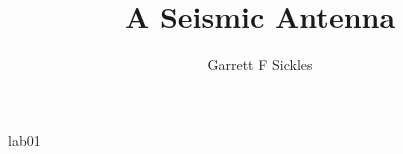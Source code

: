 
\def\thisdoc{lab01}
\def\exedirs{sigsbee}

\author{Garrett F Sickles}
\title{A Seismic Antenna}{\thisdoc}

%



%

\tiny
\clearpage

\normalsize

